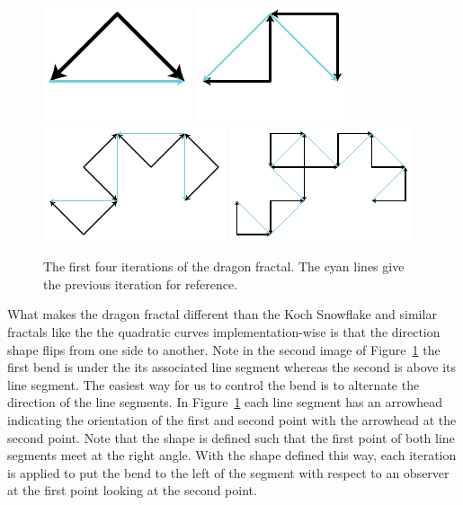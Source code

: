 \begin{figure}[htb]
  \centering
  \includegraphics[scale=1.25]{images/Dragon01}
  \hfill
  \includegraphics[scale=1.25]{images/Dragon02}
  \hfill
  \includegraphics[scale=1.25]{images/Dragon03}
  \hfill
  \includegraphics[scale=1.25]{images/Dragon04}
  \caption[The first four iterations of the dragon fractal.]{
    The first four iterations of the dragon fractal.
    The cyan lines give the previous iteration for reference.
  }
  \label{fig:DragonFirst4}
\end{figure}

What makes the dragon fractal different than the Koch Snowflake and similar fractals like the the quadratic curves implementation-wise is that the direction shape flips from one side to another.
Note in the second image of Figure~\ref{fig:DragonFirst4} the first bend is under the its associated line segment whereas the second is above its line segment.
The easiest way for us to control the bend is to alternate the direction of the line segments.
In Figure~\ref{fig:DragonFirst4} each line segment has an arrowhead indicating the orientation of the first and second point with the arrowhead at the second point.
Note that the shape is defined such that the first point of both line segments meet at the right angle.
With the shape defined this way, each iteration is applied to put the bend to the left of the segment with respect to an observer at the first point looking at the second point.

